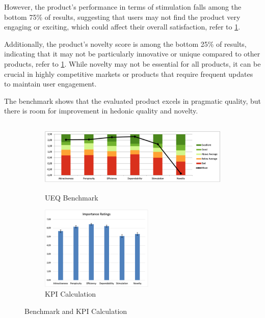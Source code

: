 \documentclass[conference,onecolumn]{IEEEtran}
\begin{document}
            However, the product's performance in terms of stimulation falls among the bottom 75\% of results, suggesting that users may not find the product very engaging or exciting, which could affect their overall satisfaction, refer to \figurename{\ref{UEQ Benchmark}}.

            Additionally, the product's novelty score is among the bottom 25\% of results, indicating that it may not be particularly innovative or unique compared to other products, refer to \figurename{\ref{UEQ Benchmark}}. While novelty may not be essential for all products, it can be crucial in highly competitive markets or products that require frequent updates to maintain user engagement.

            The benchmark shows that the evaluated product excels in pragmatic quality, but there is room for improvement in hedonic quality and novelty.
            
            \begin{figure}[H]
                \centering
                \begin{subfigure}[b]{0.6\textwidth}
                    \centerline{\includegraphics[height=35mm,scale=1]{./images/Resutls_Benchmark.png}}
                    \caption{UEQ Benchmark}
                    \label{UEQ Benchmark}
                \end{subfigure}
                \hfill
                \begin{subfigure}[b]{0.3\textwidth}
                    \centerline{\includegraphics[height=40mm,scale=1]{./images/Results_KPUCalculation.png}}
                    \caption{KPI Calculation}
                    \label{KPI Calculation}
                \end{subfigure}
                \caption{Benchmark and KPI Calculation}
                \label{fig:Benchmark and KPI Calculation}
            \end{figure}
\end{document}
